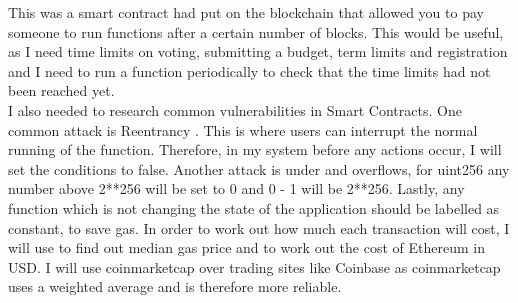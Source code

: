 This was a smart contract \cite{Merriam:2017:pdflatex} had put on the blockchain that allowed you to pay someone to run functions after a certain number of blocks. This would be useful, as I need time limits on voting, submitting a budget, term limits and registration and I need to run a function periodically to check that the time limits had not been reached yet. \\
I also needed to research common vulnerabilities in Smart Contracts. One common attack is Reentrancy \citep{Grincalaitis:2017:pdflatex}. This is where users can interrupt the normal running of the function.  Therefore, in my system before any actions occur, I will set the conditions to false. Another attack is under and overflows, for uint256 any number above 2**256 will be set to 0 and 0 - 1 will be 2**256. Lastly, any function which is not changing the state of the application should be labelled as constant, to save gas.
In order to work out how much each transaction will cost, I will use \citet{ethgas:2018:pdflatex} to find out median gas price and \citet{coinmarket:2018:pdflatex} to work out the cost of Ethereum in USD. I will use coinmarketcap over trading sites like Coinbase as coinmarketcap uses a weighted average and is therefore more reliable.